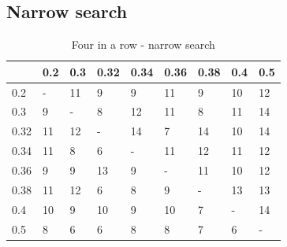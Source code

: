 \documentclass[
11pt, %
english, %
singlespacing, %
headsepline, %
]{MastersDoctoralThesis} %
\begin{document}
\begin{appendices}
\subsection{Narrow search}
\begin{table}[H]
	\centering
	\begin{tabular}{|l||l|l|l|l|l|l|l|l|}
		\hline
		& 0.2 & 0.3 & 0.32 & 0.34 & 0.36 & 0.38 & 0.4 & 0.5 \\ \hline\hline
		0.2  & -   & 11  & 9    & 9    & 11   & 9    & 10  & 12  \\ \hline
		0.3  & 9   & -   & 8    & 12   & 11   & 8    & 11  & 14  \\ \hline
		0.32 & 11  & 12  & -    & 14   & 7    & 14   & 10  & 14  \\ \hline
		0.34 & 11  & 8   & 6    & -    & 11   & 12   & 11  & 12  \\ \hline
		0.36 & 9   & 9   & 13   & 9    & -    & 11   & 10  & 12  \\ \hline
		0.38 & 11  & 12  & 6    & 8    & 9    & -    & 13  & 13  \\ \hline
		0.4  & 10  & 9   & 10   & 9    & 10   & 7    & -   & 14  \\ \hline
		0.5  & 8   & 6   & 6    & 8    & 8    & 7    & 6   & -   \\ \hline
	\end{tabular}
	\caption{Four in a row - narrow search}
	\label{table:fourinarow-narrow}
\end{table}


\end{appendices}
\end{document}
